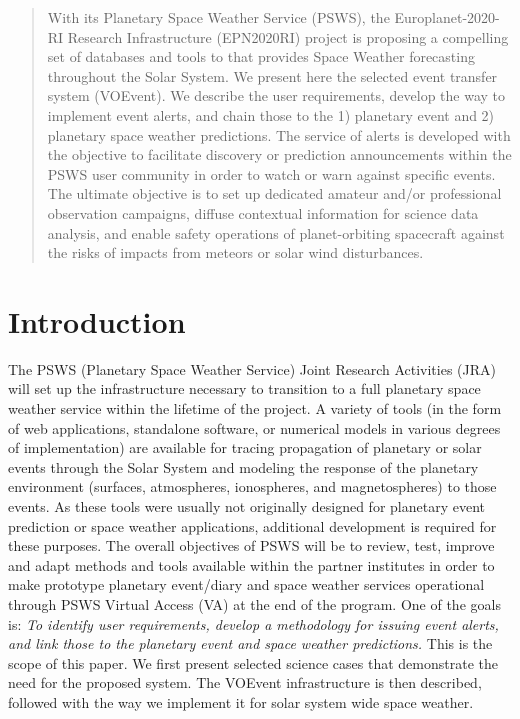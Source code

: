\documentclass[referee,a4paper,12pt,traditabstract]{swsc}
\begin{document}
\begin{linenumbers}
\begin{abstract}
{With its Planetary Space Weather Service (PSWS), the Europlanet-2020-RI Research Infrastructure (EPN2020RI) project is proposing a compelling set of databases and tools to that provides Space Weather forecasting throughout the Solar System. We present here the selected event transfer system (VOEvent). We describe the user requirements, develop the way to implement event alerts, and chain those to the 1) planetary event and 2) planetary space weather predictions. The service of alerts is developed with the objective to facilitate discovery or prediction announcements within the PSWS user community in order to watch or warn against specific events. The ultimate objective is to set up dedicated amateur and/or professional observation campaigns, diffuse contextual information for science data analysis, and enable safety operations of planet-orbiting spacecraft against the risks of impacts from meteors or solar wind disturbances.}
\end{abstract}

   \maketitle
   
\section{Introduction}
The PSWS (Planetary Space Weather Service) \citep{2018P&SS..150...50A} Joint Research Activities (JRA) will set up the infrastructure necessary to transition to a full planetary space weather service within the lifetime of the project. A variety of tools (in the form of web applications, standalone software, or numerical models in various degrees of implementation) are available for tracing propagation of planetary or solar events through the Solar System and modeling the response of the planetary environment (surfaces, atmospheres, ionospheres, and magnetospheres) to those events. As these tools were usually not originally designed for planetary event prediction or space weather applications, additional development is required for these purposes. The overall objectives of PSWS will be to review, test, improve and adapt methods and tools available within the partner institutes in order to make prototype planetary event/diary and space weather services operational through PSWS Virtual Access (VA) at the end of the program. One of the goals is: \emph{To identify user requirements, develop a methodology for issuing event alerts, and link those to the planetary event and space weather predictions.} This is the scope of this paper. We first present selected science cases that demonstrate the need for the proposed system. The VOEvent infrastructure is then described, followed with the way we implement it for solar system wide space weather. 


\end{linenumbers}
\end{document}

